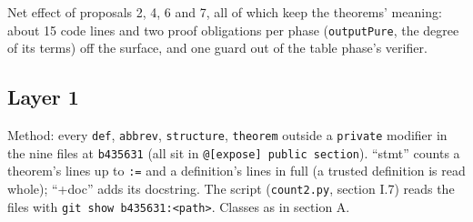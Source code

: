 Net effect of proposals 2, 4, 6 and 7, all of which keep the theorems' meaning: about 15 code lines and two proof obligations per phase (\texttt{outputPure}, the degree of its terms) off the surface, and one guard out of the table phase's verifier.

\subsection{Layer 1}\label{sec:gen-surface-layer1}

\par{}\par

Method: every \texttt{def}, \texttt{abbrev}, \texttt{structure}, \texttt{theorem} outside a \texttt{private} modifier in the nine files at \texttt{b435631} (all sit in \texttt{@[expose] public section}). \enquote{stmt} counts a theorem's lines up to \texttt{:=} and a definition's lines in full (a trusted definition is read whole); \enquote{+doc} adds its docstring. The script (\texttt{count2.\allowbreak{}py}, section I.7) reads the files with \texttt{git show b435631:<path>}. Classes as in section A.

